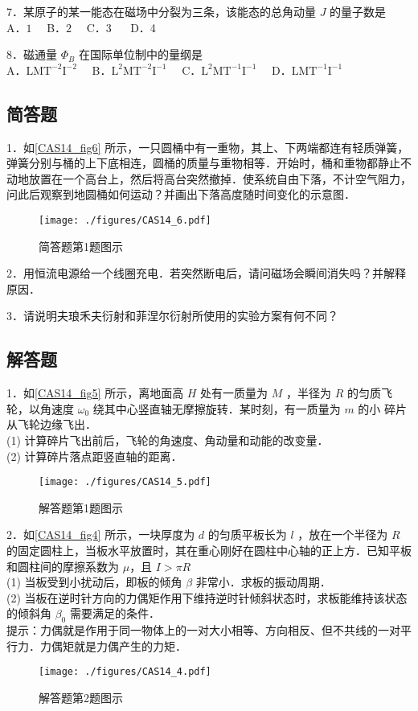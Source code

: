 7．某原子的某一能态在磁场中分裂为三条，该能态的总角动量 $J$ 的量子数是\\
A．$1\quad $ B．$2 \quad$ C．3 $\quad$ D．4

8．磁通量 $\Phi_B$ 在国际单位制中的量纲是\\
A．$\mathrm{LMT^{-2}I^{-2}}\quad$ B．$\mathrm{L^{2}MT^{-2}I^{-1}}\quad$ C．$\mathrm{L^{2}MT^{-1}I^{-1}}\quad$ D．$\mathrm{LMT^{-1}I^{-1}}$

\subsection{简答题}
1．如\autoref{CAS14_fig6} 所示，一只圆桶中有一重物，其上、下两端都连有轻质弹簧，弹簧分别与桶的上下底相连，圆桶的质量与重物相等．开始时，桶和重物都静止不动地放置在一个高台上，然后将高台突然撤掉．使系统自由下落，不计空气阻力，问此后观察到地圆桶如何运动？并画出下落高度随时间变化的示意图．
\begin{figure}[ht]
\centering
\texttt{[image: ./figures/CAS14\_6.pdf]}
\caption{简答题第1题图示} \label{CAS14_fig6}
\end{figure}

2．用恒流电源给一个线圈充电．若突然断电后，请问磁场会瞬间消失吗？并解释原因．


3．请说明夫琅禾夫衍射和菲涅尔衍射所使用的实验方案有何不同？


\subsection{解答题}
1．如\autoref{CAS14_fig5} 所示，离地面高 $H$ 处有一质量为 $M$ ，半径为 $R$ 的匀质飞轮，以角速度 $\omega_0$ 绕其中心竖直轴无摩擦旋转．某时刻，有一质量为 $m$ 的小 碎片从飞轮边缘飞出．\\
(1) 计算碎片飞出前后，飞轮的角速度、角动量和动能的改变量．\\
(2) 计算碎片落点距竖直轴的距离．
\begin{figure}[ht]
\centering
\texttt{[image: ./figures/CAS14\_5.pdf]}
\caption{解答题第1题图示} \label{CAS14_fig5}
\end{figure}

2．如\autoref{CAS14_fig4} 所示，一块厚度为 $d$ 的匀质平板长为 $l$ ，放在一个半径为 $R$ 的固定圆柱上，当板水平放置时，其在重心刚好在圆柱中心轴的正上方．已知平板和圆柱间的摩擦系数为 $\mu$，且 $I>\pi R$\\
(1) 当板受到小扰动后，即板的倾角 $\beta$ 非常小．求板的振动周期．\\
(2) 当板在逆时针方向的力偶矩作用下维持逆时针倾斜状态时，求板能维持该状态的倾斜角 $\beta_0$ 需要满足的条件．\\
提示：力偶就是作用于同一物体上的一对大小相等、方向相反、但不共线的一对平行力．力偶矩就是力偶产生的力矩．
\begin{figure}[ht]
\centering
\texttt{[image: ./figures/CAS14\_4.pdf]}
\caption{解答题第2题图示} \label{CAS14_fig4}
\end{figure}

